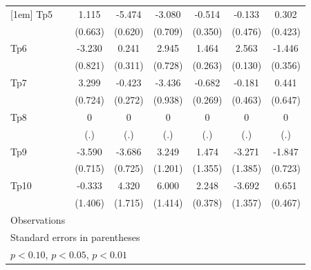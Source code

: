 \begin{longtable}{l*{6}{c}}
[1em]
Tp5                 &       1.115\sym{*}  &      -5.474\sym{***}&      -3.080\sym{***}&      -0.514         &      -0.133         &       0.302         \\
                    &     (0.663)         &     (0.620)         &     (0.709)         &     (0.350)         &     (0.476)         &     (0.423)         \\
[1em]
Tp6                 &      -3.230\sym{***}&       0.241         &       2.945\sym{***}&       1.464\sym{***}&       2.563\sym{***}&      -1.446\sym{***}\\
                    &     (0.821)         &     (0.311)         &     (0.728)         &     (0.263)         &     (0.130)         &     (0.356)         \\
[1em]
Tp7                 &       3.299\sym{***}&      -0.423         &      -3.436\sym{***}&      -0.682\sym{**} &      -0.181         &       0.441         \\
                    &     (0.724)         &     (0.272)         &     (0.938)         &     (0.269)         &     (0.463)         &     (0.647)         \\
[1em]
Tp8                 &           0         &           0         &           0         &           0         &           0         &           0         \\
                    &         (.)         &         (.)         &         (.)         &         (.)         &         (.)         &         (.)         \\
[1em]
Tp9                 &      -3.590\sym{***}&      -3.686\sym{***}&       3.249\sym{***}&       1.474         &      -3.271\sym{**} &      -1.847\sym{**} \\
                    &     (0.715)         &     (0.725)         &     (1.201)         &     (1.355)         &     (1.385)         &     (0.723)         \\
[1em]
Tp10                &      -0.333         &       4.320\sym{**} &       6.000\sym{***}&       2.248\sym{***}&      -3.692\sym{***}&       0.651         \\
                    &     (1.406)         &     (1.715)         &     (1.414)         &     (0.378)         &     (1.357)         &     (0.467)         \\
\hline
Observations        &                     &                     &                     &                     &                     &                     \\
\hline\hline
\multicolumn{7}{l}{\footnotesize Standard errors in parentheses}\\
\multicolumn{7}{l}{\footnotesize \sym{*} \(p<0.10\), \sym{**} \(p<0.05\), \sym{***} \(p<0.01\)}\\
\end{longtable}

